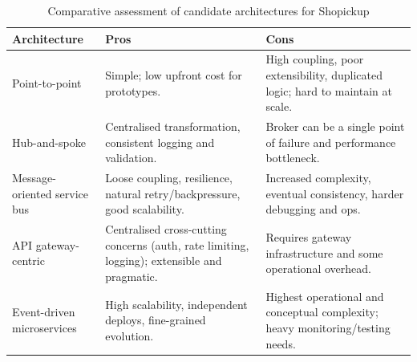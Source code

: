 \documentclass{imc-inf}
\begin{document}
\begin{table}[!htbp]
  \centering
  \small
  \begin{tabular}{@{}>{\raggedright\arraybackslash}p{3.5cm}p{5.5cm}p{5.5cm}@{}}
    \toprule
    \textbf{Architecture}                                                                        & \textbf{Pros} & \textbf{Cons} \\
    \midrule
    Point-to-point                                                                               &
    Simple; low upfront cost for prototypes.                                                     &
    High coupling, poor extensibility, duplicated logic; hard to maintain at scale.                                              \\[6pt]

    Hub-and-spoke                                                                                &
    Centralised transformation, consistent logging and validation.                               &
    Broker can be a single point of failure and performance bottleneck.                                                          \\[6pt]

    Message-oriented service bus                                                                 &
    Loose coupling, resilience, natural retry/backpressure, good scalability.                    &
    Increased complexity, eventual consistency, harder debugging and ops.                                                        \\[6pt]

    API gateway-centric                                                                          &
    Centralised cross-cutting concerns (auth, rate limiting, logging); extensible and pragmatic. &
    Requires gateway infrastructure and some operational overhead.                                                               \\[6pt]

    Event-driven microservices                                                                   &
    High scalability, independent deploys, fine-grained evolution.                               &
    Highest operational and conceptual complexity; heavy monitoring/testing needs.                                               \\
    \bottomrule
  \end{tabular}
  \caption{Comparative assessment of candidate architectures for Shopickup}
  \label{tab:architectural-comparison}
\end{table}
\end{document}
